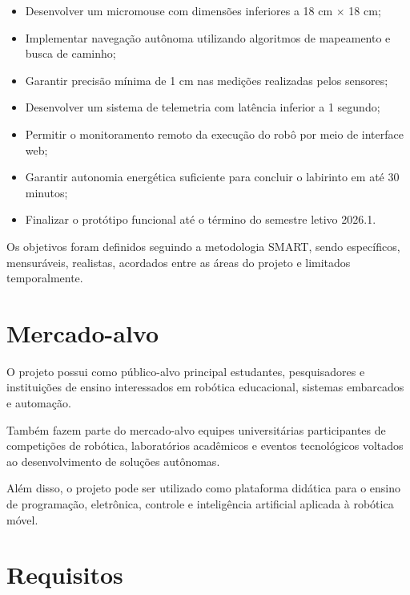 \begin{itemize}
    \item Desenvolver um micromouse com dimensões inferiores a 18 cm $\times$ 18 cm;
    
    \item Implementar navegação autônoma utilizando algoritmos de mapeamento e busca de caminho;
    
    \item Garantir precisão mínima de 1 cm nas medições realizadas pelos sensores;
    
    \item Desenvolver um sistema de telemetria com latência inferior a 1 segundo;
    
    \item Permitir o monitoramento remoto da execução do robô por meio de interface web;
    
    \item Garantir autonomia energética suficiente para concluir o labirinto em até 30 minutos;
    
    \item Finalizar o protótipo funcional até o término do semestre letivo 2026.1.
\end{itemize}

Os objetivos foram definidos seguindo a metodologia SMART, sendo específicos, mensuráveis, realistas, acordados entre as áreas do projeto e limitados temporalmente.

\section{Mercado-alvo}

O projeto possui como público-alvo principal estudantes, pesquisadores e instituições de ensino interessados em robótica educacional, sistemas embarcados e automação.

Também fazem parte do mercado-alvo equipes universitárias participantes de competições de robótica, laboratórios acadêmicos e eventos tecnológicos voltados ao desenvolvimento de soluções autônomas.

Além disso, o projeto pode ser utilizado como plataforma didática para o ensino de programação, eletrônica, controle e inteligência artificial aplicada à robótica móvel.

\section{Requisitos}

